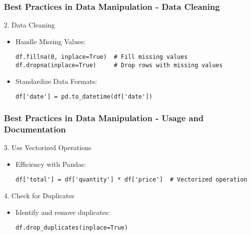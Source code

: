 \documentclass[aspectratio=169]{beamer}
\begin{document}
\begin{frame}[fragile]
  \frametitle{Best Practices in Data Manipulation - Data Cleaning}
  
  \begin{block}{2. Data Cleaning}
      \begin{itemize}
          \item Handle Missing Values:
          \begin{lstlisting}
df.fillna(0, inplace=True)  # Fill missing values
df.dropna(inplace=True)     # Drop rows with missing values
          \end{lstlisting}
          
          \item Standardize Data Formats:
          \begin{lstlisting}
df['date'] = pd.to_datetime(df['date'])
          \end{lstlisting}
      \end{itemize}
  \end{block}
  
\end{frame}

\begin{frame}[fragile]
  \frametitle{Best Practices in Data Manipulation - Usage and Documentation}
  
  \begin{block}{3. Use Vectorized Operations}
      \begin{itemize}
          \item Efficiency with Pandas:
          \begin{lstlisting}
df['total'] = df['quantity'] * df['price']  # Vectorized operation
          \end{lstlisting}
      \end{itemize}
  \end{block}
  
  \begin{block}{4. Check for Duplicates}
      \begin{itemize}
          \item Identify and remove duplicates:
          \begin{lstlisting}
df.drop_duplicates(inplace=True)
          \end{lstlisting}
      \end{itemize}
  \end{block}
  
\end{frame}
\end{document}
